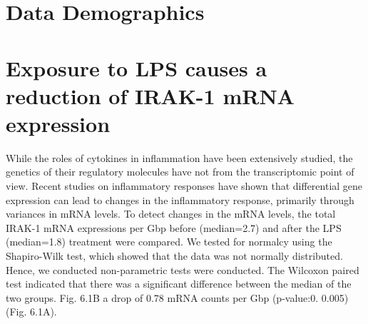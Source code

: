 {\section{ Data Demographics}\label{data-demographics}

%

\section{ Exposure to LPS causes a reduction of IRAK-1 mRNA
expression}\label{exposure-to-lps-causes-a-reduction-of-irak-1-mrna-expression}


While the roles of cytokines in inflammation have been extensively
studied, the genetics of their regulatory molecules have not from the
transcriptomic point of view. Recent studies on inflammatory responses
have shown that differential gene expression can lead to changes in the
inflammatory response, primarily through variances in mRNA levels. To
detect changes in the mRNA levels, the total IRAK-1 mRNA expressions per
Gbp before (median=2.7) and after the LPS (median=1.8) treatment were
compared. We tested for normalcy using the Shapiro-Wilk test, which
showed that the data was not normally distributed. Hence, we conducted
non-parametric tests were conducted. The Wilcoxon paired test indicated
that there was a significant difference between the median of the two
groups. Fig. 6.1B a drop of 0.78 mRNA counts per Gbp (p-value:0. 0.005)
(Fig. 6.1A).

}
